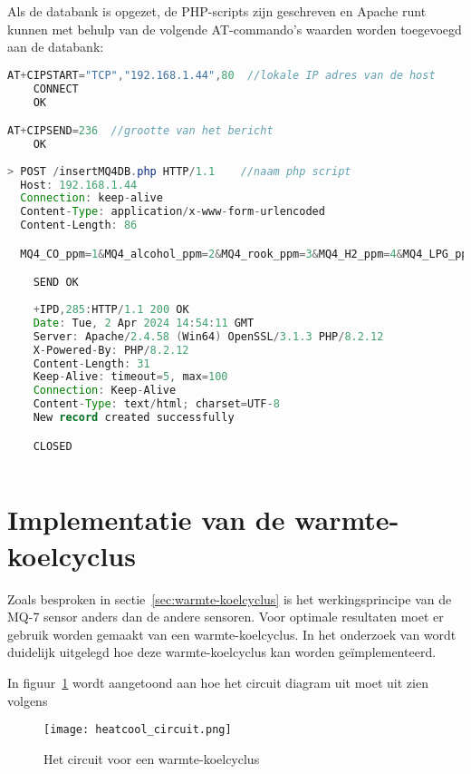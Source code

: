 Als de databank is opgezet, de PHP-scripts zijn geschreven en Apache runt kunnen met behulp van de volgende AT-commando's waarden worden toegevoegd aan de databank:
\begin{lstlisting}[language=Java,caption={ESP01 naar de database}]
AT+CIPSTART="TCP","192.168.1.44",80  //lokale IP adres van de host
    CONNECT
    OK

AT+CIPSEND=236  //grootte van het bericht
    OK
    
> POST /insertMQ4DB.php HTTP/1.1    //naam php script
  Host: 192.168.1.44
  Connection: keep-alive
  Content-Type: application/x-www-form-urlencoded
  Content-Length: 86

  MQ4_CO_ppm=1&MQ4_alcohol_ppm=2&MQ4_rook_ppm=3&MQ4_H2_ppm=4&MQ4_LPG_ppm=5&MQ4_CH4_ppm=6

    SEND OK
    
    +IPD,285:HTTP/1.1 200 OK
    Date: Tue, 2 Apr 2024 14:54:11 GMT
    Server: Apache/2.4.58 (Win64) OpenSSL/3.1.3 PHP/8.2.12
    X-Powered-By: PHP/8.2.12
    Content-Length: 31
    Keep-Alive: timeout=5, max=100
    Connection: Keep-Alive
    Content-Type: text/html; charset=UTF-8
    New record created successfully

    CLOSED
    
\end{lstlisting}


\section{Implementatie van de warmte-koelcyclus}%
\label{sec:warmte_koel}


Zoals besproken in sectie~\ref{sec:warmte-koelcyclus} is het werkingsprincipe van de MQ-7 sensor anders dan de andere sensoren. Voor optimale resultaten moet er  gebruik worden gemaakt van een warmte-koelcyclus. In het onderzoek van 
wordt duidelijk uitgelegd hoe deze warmte-koelcyclus kan worden geïmplementeerd. 

In figuur~\ref{fig:heatcool_circuit} wordt aangetoond aan hoe het circuit diagram uit moet uit zien volgens %

\begin{figure}[h]
    \texttt{[image: heatcool\_circuit.png]}
    \caption[Circuit warmte-koelcyclus]{Het circuit voor een warmte-koelcyclus
    }
    \label{fig:heatcool_circuit}
\end{figure}

